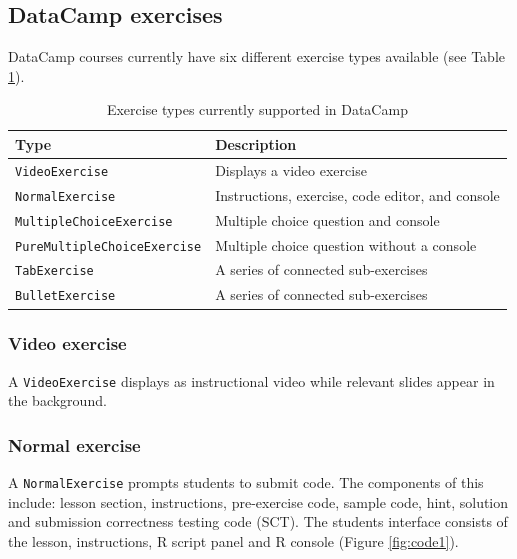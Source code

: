 \documentclass{tise_style_doi}
\begin{document}
\subsection{DataCamp exercises}

DataCamp courses currently have six different exercise types available (see
Table \ref{tab:exercises}).

\begin{table}\label{tab:exercises}
\caption{Exercise types currently supported in DataCamp}
\begin{tabular}{ll}
\toprule
Type & Description \\
\midrule
\texttt{VideoExercise}              & Displays a video exercise \\
\texttt{NormalExercise}	            & Instructions, exercise, code editor, and console \\
\texttt{MultipleChoiceExercise}     & Multiple choice question and console \\
\texttt{PureMultipleChoiceExercise} & Multiple choice question without a console \\
\texttt{TabExercise}	            & A series of connected sub-exercises \\
\texttt{BulletExercise}	            & A series of connected sub-exercises \\
\bottomrule
\end{tabular}
\end{table}

\subsubsection{Video exercise}

A \texttt{VideoExercise} displays as instructional video while relevant
slides appear in the background.

\subsubsection{Normal exercise}

A \texttt{NormalExercise} prompts students to submit code. The components of this 
include: lesson section, instructions, pre-exercise code, sample code, hint, solution 
and submission correctness testing code (SCT). The students interface consists of the 
lesson, instructions, R script panel and R console (Figure \ref{fig:code1}).
\end{document}
